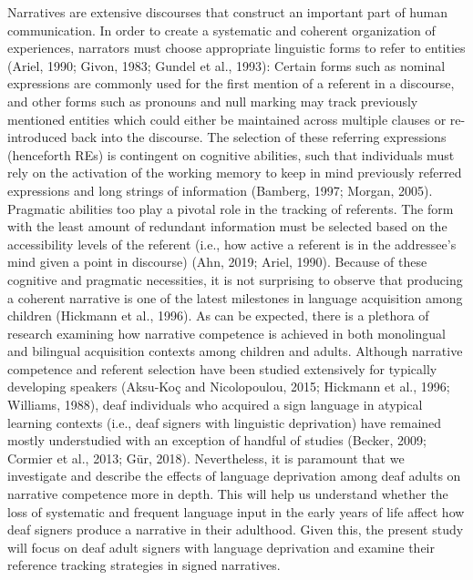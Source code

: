 \documentclass[]{elsarticle} %
\begin{document}
Narratives are extensive discourses that construct an important part of
human communication. In order to create a systematic and coherent
organization of experiences, narrators must choose appropriate
linguistic forms to refer to entities (Ariel, 1990; Givon, 1983; Gundel
et al., 1993): Certain forms such as nominal expressions are commonly
used for the first mention of a referent in a discourse, and other forms
such as pronouns and null marking may track previously mentioned
entities which could either be maintained across multiple clauses or
re-introduced back into the discourse. The selection of these referring
expressions (henceforth REs) is contingent on cognitive abilities, such
that individuals must rely on the activation of the working memory to
keep in mind previously referred expressions and long strings of
information (Bamberg, 1997; Morgan, 2005). Pragmatic abilities too play
a pivotal role in the tracking of referents. The form with the least
amount of redundant information must be selected based on the
accessibility levels of the referent (i.e., how active a referent is in
the addressee's mind given a point in discourse) (Ahn, 2019; Ariel,
1990). Because of these cognitive and pragmatic necessities, it is not
surprising to observe that producing a coherent narrative is one of the
latest milestones in language acquisition among children (Hickmann et
al., 1996). As can be expected, there is a plethora of research
examining how narrative competence is achieved in both monolingual and
bilingual acquisition contexts among children and adults. Although
narrative competence and referent selection have been studied
extensively for typically developing speakers (Aksu-Koç and
Nicolopoulou, 2015; Hickmann et al., 1996; Williams, 1988), deaf
individuals who acquired a sign language in atypical learning contexts
(i.e., deaf signers with linguistic deprivation) have remained mostly
understudied with an exception of handful of studies (Becker, 2009;
Cormier et al., 2013; Gür, 2018). Nevertheless, it is paramount that we
investigate and describe the effects of language deprivation among deaf
adults on narrative competence more in depth. This will help us
understand whether the loss of systematic and frequent language input in
the early years of life affect how deaf signers produce a narrative in
their adulthood. Given this, the present study will focus on deaf adult
signers with language deprivation and examine their reference tracking
strategies in signed narratives.
\end{document}

